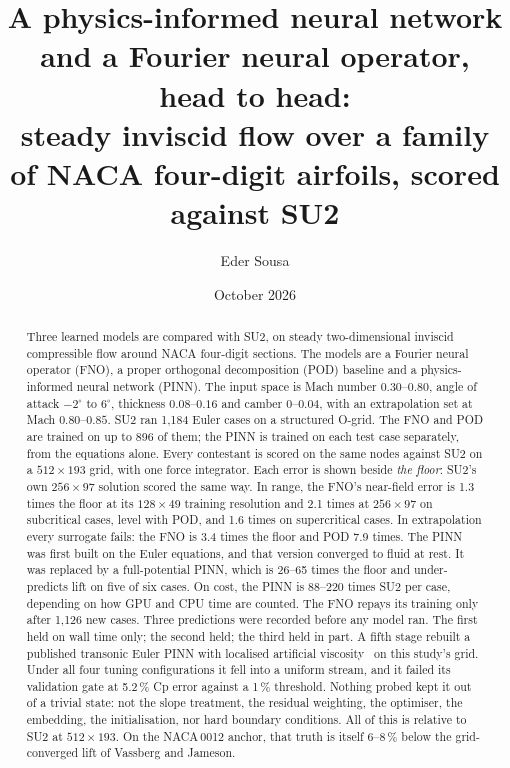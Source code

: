 \documentclass[11pt]{article}
\title{A physics-informed neural network and a Fourier neural operator, head to head:\\
\large steady inviscid flow over a family of NACA four-digit airfoils, scored against SU2}
\author{Eder Sousa}
\date{October 2026}
\begin{document}
\maketitle

\begin{abstract}
\noindent
Three learned models are compared with SU2, on steady two-dimensional inviscid compressible flow
around NACA four-digit sections. The models are a Fourier neural operator (FNO), a proper
orthogonal decomposition (POD) baseline and a physics-informed neural network (PINN).
The input space is Mach number $0.30$--$0.80$, angle of attack $-2^\circ$ to $6^\circ$, thickness
$0.08$--$0.16$ and camber $0$--$0.04$, with an extrapolation set at Mach $0.80$--$0.85$.
SU2 ran 1,184 Euler cases on a structured O-grid. The FNO and POD are trained on up to 896 of
them; the PINN is trained on each test case separately, from the equations alone.
Every contestant is scored on the same nodes against SU2 on a $512\times193$ grid, with one force
integrator. Each error is shown beside \emph{the floor}: SU2's own $256\times97$ solution scored
the same way.
In range, the FNO's near-field error is 1.3 times the floor at its $128\times49$ training
resolution and 2.1 times at $256\times97$ on subcritical cases, level with POD, and 1.6 times on
supercritical cases. In extrapolation every surrogate fails: the FNO is 3.4 times the floor and POD
7.9 times.
The PINN was first built on the Euler equations, and that version converged to fluid at rest. It
was replaced by a full-potential PINN, which is 26--65 times the floor and under-predicts lift
on five of six cases.
On cost, the PINN is 88--220 times SU2 per case, depending on how GPU and CPU time are counted.
The FNO repays its training only after 1,126 new cases.
Three predictions were recorded before any model ran. The first held on wall time only; the
second held; the third held in part.
A fifth stage rebuilt a published transonic Euler PINN with localised artificial
viscosity~\cite{wassing2025} on this study's grid. Under all four tuning configurations it fell
into a uniform stream, and it failed its validation gate at 5.2\,\% Cp error against a 1\,\%
threshold. Nothing probed kept it out of a trivial state: not the slope treatment, the residual
weighting, the optimiser, the embedding, the initialisation, nor hard boundary conditions.
All of this is relative to SU2 at $512\times193$. On the NACA\,0012 anchor, that truth is itself
6--8\,\% below the grid-converged lift of Vassberg and Jameson.
\end{abstract}
\end{document}
